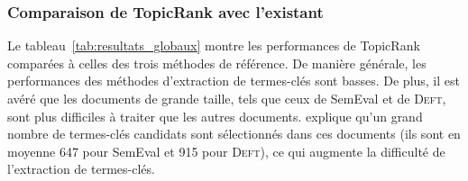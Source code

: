       \subsubsection{Comparaison de TopicRank avec l'existant}
      \label{subsubsec:main-automatic_keyphrase_annotation-unsupervised_automatic_keyphrase_extraction-evaluation-comparison}
        Le tableau~\ref{tab:resultats_globaux} montre les performances de
        TopicRank comparées à celles des trois méthodes de référence. De manière
        générale, les performances des méthodes d'extraction de termes-clés sont
        basses. De plus, il est avéré que les documents de grande taille, tels
        que ceux de SemEval et de \textsc{Deft}, sont plus difficiles à traiter que les
        autres documents.  explique qu'un
        grand nombre de termes-clés candidats sont sélectionnés dans ces
        documents (ils sont en moyenne 647 pour SemEval et 915 pour
        \textsc{Deft}), ce qui augmente la difficulté de l'extraction de
        termes-clés.

